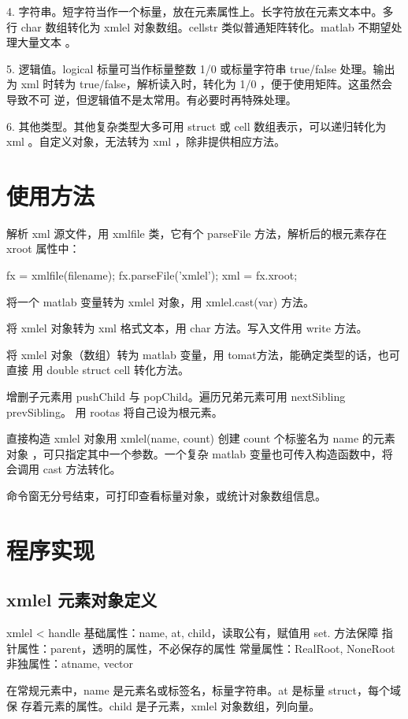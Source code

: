 4. 字符串。短字符当作一个标量，放在元素属性上。长字符放在元素文本中。多行 char
数组转化为 xmlel 对象数组。cellstr 类似普通矩阵转化。matlab 不期望处理大量文本
。

5. 逻辑值。logical 标量可当作标量整数 1/0 或标量字符串 true/false 处理。输出为
xml 时转为 true/false，解析读入时，转化为 1/0 ，便于使用矩阵。这虽然会导致不可
逆，但逻辑值不是太常用。有必要时再特殊处理。

6. 其他类型。其他复杂类型大多可用 struct 或 cell 数组表示，可以递归转化为 xml
。自定义对象，无法转为 xml ，除非提供相应方法。

\section{使用方法}

解析 xml 源文件，用 xmlfile 类，它有个 parseFile 方法，解析后的根元素存在
xroot 属性中：

fx = xmlfile(filename);
fx.parseFile('xmlel');
xml = fx.xroot;

将一个 matlab 变量转为 xmlel 对象，用 xmlel.cast(var) 方法。

将 xmlel 对象转为 xml 格式文本，用 char 方法。写入文件用 write 方法。

将 xmlel 对象（数组）转为 matlab 变量，用 tomat方法，能确定类型的话，也可直接
用 double struct cell 转化方法。

增删子元素用 pushChild 与 popChild。遍历兄弟元素可用 nextSibling prevSibling。
用 rootas 将自己设为根元素。

直接构造 xmlel 对象用 xmlel(name, count) 创建 count 个标鉴名为 name 的元素对象
，可只指定其中一个参数。一个复杂 matlab 变量也可传入构造函数中，将会调用 cast
方法转化。

命令窗无分号结束，可打印查看标量对象，或统计对象数组信息。

\section{程序实现}

\subsection{xmlel 元素对象定义}

xmlel < handle
基础属性：name, at, child，读取公有，赋值用 set. 方法保障
指针属性：parent，透明的属性，不必保存的属性
常量属性：RealRoot, NoneRoot
非独属性：atname, vector

在常规元素中，name 是元素名或标签名，标量字符串。at 是标量 struct，每个域保
存着元素的属性。child 是子元素，xmlel 对象数组，列向量。

